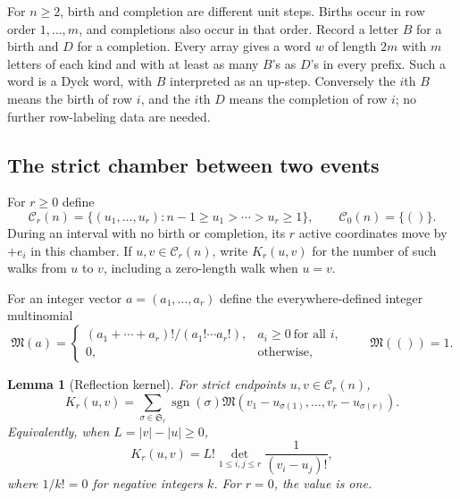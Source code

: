 \documentclass[11pt,letterpaper]{article}
\numberwithin{equation}{section}
\newtheorem{lemma}[theorem]{Lemma}
\theoremstyle{definition}
\newcommand{\1}{\mathbf 1}
\DeclareMathOperator{\sgn}{sgn}
\newcommand{\Sym}{\mathfrak S}
\newcommand{\M}{\mathfrak M}
\begin{document}
For $n\ge2$, birth and completion are different unit steps. Births occur
in row order $1,\ldots,m$, and completions also occur in that order.
Record a letter $B$ for a birth and $D$ for a completion. Every array gives
a word $w$ of length $2m$ with $m$ letters of each kind and with at least
as many $B$'s as $D$'s in every prefix. Such a word is a Dyck word, with
$B$ interpreted as an up-step. Conversely the $i$th $B$ means the birth
of row $i$, and the $i$th $D$ means the completion of row $i$; no further
row-labeling data are needed.

\subsection{The strict chamber between two events}
For $r\ge0$ define
\begin{equation}
 \mathcal C_r(n)=\{(u_1,\ldots,u_r):n-1\ge u_1>\cdots>u_r\ge1\},
 \qquad \mathcal C_0(n)=\{()\}.
 \label{shr:bp:eq:chamber}
\end{equation}
During an interval with no birth or completion, its $r$ active coordinates
move by $+e_i$ in this chamber. If $u,v\in\mathcal C_r(n)$, write
$K_r(u,v)$ for the number of such walks from $u$ to $v$, including a
zero-length walk when $u=v$.

For an integer vector $a=(a_1,\ldots,a_r)$ define the everywhere-defined
integer multinomial
\begin{equation}
 \M(a)=
 \begin{cases}
 (a_1+\cdots+a_r)!/(a_1!\cdots a_r!),&a_i\ge0\ \text{for all }i,\\
 0,&\text{otherwise},
 \end{cases}
 \qquad \M(())=1.
 \label{shr:bp:eq:M}
\end{equation}

\begin{lemma}[Reflection kernel]
\label{shr:bp:lem:kernel}
For strict endpoints $u,v\in\mathcal C_r(n)$,
\begin{equation}
 K_r(u,v)=\sum_{\sigma\in\Sym_r}\sgn(\sigma)
 \M(v_1-u_{\sigma(1)},\ldots,v_r-u_{\sigma(r)}).
 \label{shr:bp:eq:kernel}
\end{equation}
Equivalently, when $L=|v|-|u|\ge0$,
\begin{equation}
 K_r(u,v)=L!\det_{1\le i,j\le r}\frac1{(v_i-u_j)!},
 \label{shr:bp:eq:detkernel}
\end{equation}
where $1/k!=0$ for negative integers $k$. For $r=0$, the value is one.
\end{lemma}
\end{document}
